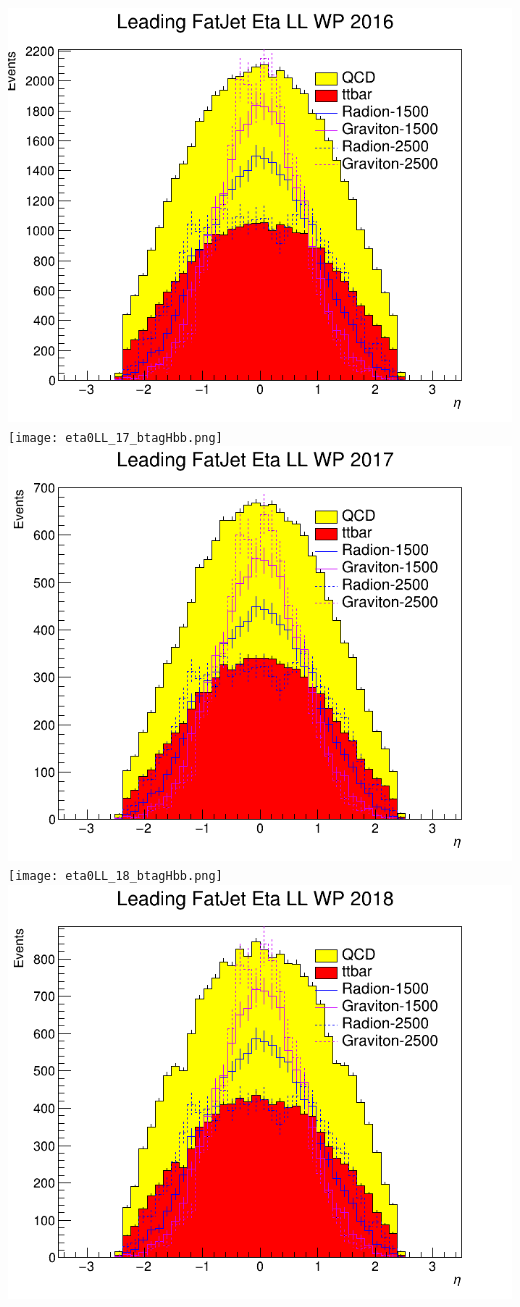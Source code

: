 \includegraphics[width=1\textwidth]{eta0LL_16_deepTagMD_HbbvsQCD.png}
\texttt{[image: eta0LL\_17\_btagHbb.png]}
\includegraphics[width=1\textwidth]{eta0LL_17_deepTagMD_HbbvsQCD.png}
\texttt{[image: eta0LL\_18\_btagHbb.png]}
\includegraphics[width=1\textwidth]{eta0LL_18_deepTagMD_HbbvsQCD.png}
